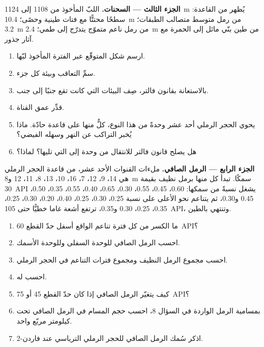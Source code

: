 \begin{problem}
\medskip\noindent\textbf{الجزء الثالث --- السحنات.} اللبّ المأخوذ من 1108 إلى
\qty{1124}{m} يُظهر من القاعدة: سطحًا محتتًّا مع فتات طينية
وحصًى؛ \qty{10.4}{m} من رمل متوسط متصالب الطبقات؛ \qty{3.2}{m} من رمل
ناعم متموّج يتدرّج إلى طمي؛ \qty{2.4}{m} من طين بنّي مائل إلى الحمرة مع آثار جذور.
\begin{enumerate}[resume]
\item ارسم شكل  المتوقّع عبر الفترة المأخوذ لبّها.
\item سمِّ التعاقب وبيئة كل جزء.
\item بالاستعانة بقانون فالتر، صِف البيئات التي كانت تقع جنبًا إلى جنب.
\item قدِّر عمق القناة.
\item يحوي الحجر الرملي أحد عشر وحدةً من هذا النوع، كلٌّ منها على قاعدة حادّة. ماذا
  يُخبر التراكب عن النهر وسهله الفيضي؟
\item هل يصلح قانون فالتر للانتقال من وحدة إلى التي تليها؟ لماذا؟
\end{enumerate}

\medskip\noindent\textbf{الجزء الرابع --- الرمل الصافي.} ملءات القنوات الأحد عشر،
من قاعدة الحجر الرملي هي 14، 9، 12، 7، 16، 10، 13، 8، 11، 12
و\qty{8}{m} سمكًا. تبدأ كل منها برمل نظيف بقيمة \qty{30}{API} يشغل نسبةً
من سمكها: 0.60، 0.45، 0.55، 0.30، 0.65، 0.40، 0.55، 0.35، 0.50،
0.45 و0.30، ثم يتناعم نحو الأعلى على نسبة 0.25، 0.30، 0.25، 0.40،
0.20، 0.30، 0.25، 0.35، 0.25، 0.30 و0.35، ترتفع أشعة غاما خطيًّا حتى
\qty{105}{API}، وتنتهي بالطين.
\begin{enumerate}[resume]
\item ما الكسر من كل فترة تناعم الواقع أسفل
  حدّ القطع \qty{60}{API}؟
\item احسب الرمل الصافي للوحدة السفلى وللوحدة الأسمك.
\item احسب مجموع الرمل النظيف ومجموع فترات التناعم في
  الحجر الرملي.
\item احسب  له.
\item كيف يتغيّر الرمل الصافي إذا كان حدّ القطع 45 أو
  \qty{75}{API}؟
\item بمسامية الرمل الواردة في السؤال 8، احسب حجم المسام في
  الرمل الصافي تحت كيلومتر مربّع واحد.
\item اذكر سُمك الرمل الصافي للحجر الرملي الترياسي عند فاردن-2.
\end{enumerate}
\end{problem}
